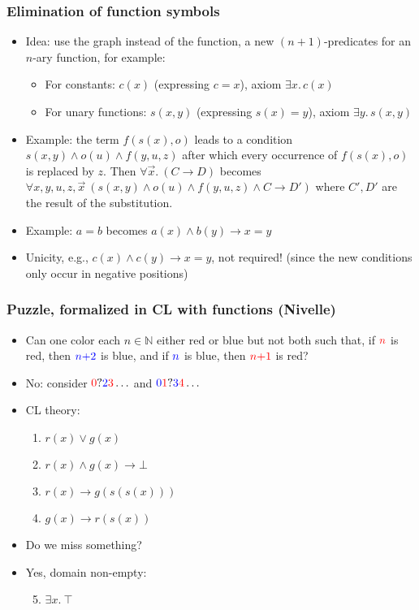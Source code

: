 \documentclass[handout,11pt]{beamer}
\newcommand{\blue}[1]{\textcolor{blue}{#1}}
\newcommand{\red}[1]{\textcolor{red}{#1}}
\newcommand{\nat}{\mathbb{N}}
\newcommand{\imp}{\rightarrow}
\begin{document}
\begin{frame}
\frametitle{Elimination of function symbols}
 \begin{itemize}[<+->]
  \item Idea: use the graph instead of the function,
  a new $(n{+}1)$-predicates for an $n$-ary function, for example:
   \begin{itemize}[<+->]
    \item For constants: $c(x)$ (expressing $c=x$), 
     axiom $\exists x.\,c(x)$
    \item For unary functions: 
    $s(x,y)$ (expressing $s(x)=y$), axiom $\exists y.\,s(x,y)$
   \end{itemize} 
   \item Example: the term $f(s(x),o)$ leads to a condition
   $s(x,y)\land o(u)\land f(y,u,z)$ after which every occurrence of
   $f(s(x),o)$ is replaced by $z$. Then $\forall\vec{x}.~(C \to D)$ becomes 
   $\forall x,y,u,z,\vec{x}~(s(x,y)\land o(u)\land f(y,u,z)\land C\to D')$ 
   where $C',D'$ are the result of the substitution.
   \item Example: $a=b$ becomes $a(x) \land b(y) \to x=y$   
   \item Unicity, e.g., $c(x)\land c(y)\to x=y$, \alert{not} required!
   (since the new conditions only occur in negative positions)
 \end{itemize}
\end{frame}

\begin{frame}
\frametitle{Puzzle, formalized in CL with functions (Nivelle)} 
 \begin{itemize}[<+->]
     \item Can one color each
     $n\in\nat$ either red or blue but not both such that, 
     if $\red{n}$ is red, then $\blue{n{+}2}$ is blue, 
     and if  $\blue{n}$ is blue, then $\red{n{+}1}$ is red?
    \item No: consider $\red{0}?\blue{2}\red{3}\ldots$
    and $\blue{0}\red{1}?\blue{3}\red{4}\ldots$
    \item CL theory:
    \begin{enumerate}
       \item $r(x) \vee g(x)$ 
       \item $r(x) \wedge g(x) \imp \bot$
       \item $r(x) \imp g(s(s(x)))$ 
       \item $g(x) \imp r(s(x))$
     \end{enumerate}
   \item Do we miss something?
   \item Yes, domain non-empty: 
    \begin{enumerate}       
       \setcounter{enumi}{4}       
       \item $\exists x.~\top$
    \end{enumerate}
 \end{itemize}
\end{frame}
\end{document}
